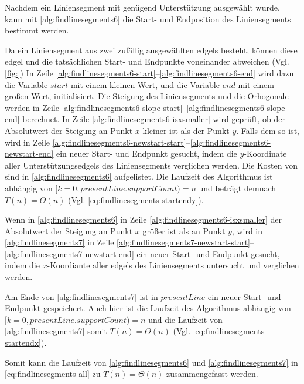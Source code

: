 Nachdem ein Liniensegment mit genügend Unterstützung ausgewählt wurde, kann mit \autoref{alg:findlinesegments6} die
 Start- und Endposition des Liniensegments bestimmt werden.

Da ein Liniensegment aus zwei zufällig ausgewählten \glspl{edgel} besteht, können diese \gls{edgel} und die
 tatsächlichen Start- und Endpunkte voneinander abweichen (Vgl. \autoref{fig:}) In Zeile
 \ref{alg:findlinesegments6-start}--\ref{alg:findlinesegments6-end} wird dazu die Variable $\mathit{start}$ mit einem
 kleinen Wert, und die Variable $\mathit{end}$ mit einem großen Wert, initialisiert. Die Steigung des Liniensegments
 und die Orhogonale werden in Zeile \ref{alg:findlinesegments6-slope-start}--\ref{alg:findlinesegments6-slope-end}
 berechnet. In Zeile \ref{alg:findlinesegments6-isxsmaller} wird geprüft, ob der Absolutwert der Steigung an Punkt $x$
 kleiner ist als der Punkt $y$. Falls dem so ist, wird in Zeile
 \ref{alg:findlinesegments6-newstart-start}--\ref{alg:findlinesegments6-newstart-end} ein neuer Start- und Endpunkt
 gesucht, indem die $y$-Koordinate aller Unterstützungsedgels des Liniensegments verglichen werden. Die Kosten von
  sind in \autoref{alg:findlinesegments6} aufgelistet. Die Laufzeit des Algorithmus ist
 abhängig von $[k=0,\mathit{presentLine.supportCount}) = n$ und beträgt demnach $T(n) = \Theta(n)$
 (Vgl. \autoref{eq:findlinesegments-startendy}).

Wenn in \autoref{alg:findlinesegments6} in Zeile \ref{alg:findlinesegments6-isxsmaller} der Absolutwert der Steigung an
 Punkt $x$ größer ist als an Punkt $y$, wird in \autoref{alg:findlinesegments7} in Zeile
 \ref{alg:findlinesegments7-newstart-start}--\ref{alg:findlinesegments7-newstart-end} ein neuer Start- und Endpunkt
 gesucht, indem die $x$-Koordiante aller \glspl{edgel} des Liniensegments untersucht und verglichen werden.

Am Ende von \autoref{alg:findlinesegments7} ist in $\mathit{presentLine}$ ein neuer Start- und Endpunkt gespeichert.
 Auch hier ist die Laufzeit des Algorithmus abhängig von $[k=0,\mathit{presentLine.supportCount}) = n$ und die Laufzeit
 von \autoref{alg:findlinesegments7} somit $T(n) = \Theta(n)$ (Vgl. \autoref{eq:findlinesegments-startendx}).

Somit kann die Laufzeit von \autoref{alg:findlinesegments6} und \autoref{alg:findlinesegments7} in
 \autoref{eq:findlinesegments-all} zu $T(n) = \Theta(n)$ zusammengefasst werden.


